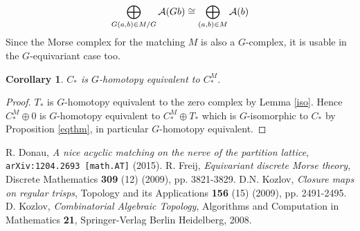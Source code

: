 \documentclass{elsarticle}
\newtheorem{cor}[df]{Corollary}
\begin{document}
\[
\bigoplus_{G(a,b)\in M/G}{\cal A}(Gb)\cong\bigoplus_{(a,b)\in M}{\cal A}(b)
\]
Since the Morse complex for the matching $M$ is also a $G$-complex, it is usable in the $G$-equivariant case too.
\begin{cor}
$C_*$ is $G$-homotopy equivalent to $C_*^M$.
\end{cor}
\begin{proof}
$T_*$ is $G$-homotopy equivalent to the zero complex by Lemma \ref{iso}. Hence $C_*^M\oplus 0$ is $G$-homotopy equivalent to $C_*^M\oplus T_*$ which is $G$-isomorphic to $C_*$ by Proposition \ref{eqthm}, in particular $G$-homotopy equivalent.
\end{proof}

\begin{thebibliography}{00}
R. Donau, \textit{A nice acyclic matching on the nerve of the partition lattice}, \texttt{arXiv:1204.2693 [math.AT]} (2015).
R. Freij, \textit{Equivariant discrete Morse theory}, Discrete Mathematics \textbf{309} (12) (2009), pp. 3821-3829.
D.N. Kozlov, \textit{Closure maps on regular trisps}, Topology and its Applications \textbf{156} (15) (2009), pp. 2491-2495.
D. Kozlov, \textit{Combinatorial Algebraic Topology}, Algorithms and Computation in Mathematics \textbf{21}, Springer-Verlag Berlin Heidelberg, 2008.
\end{thebibliography}
\end{document}
